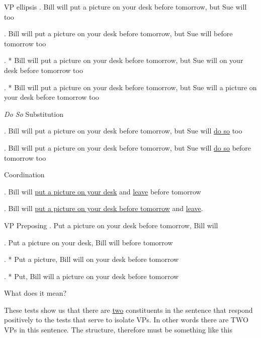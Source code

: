 \begin{frame}
  {VP ellipsis}
\ex.
Bill will put a picture on your desk before tomorrow, but Sue will  too

\ex.
Bill will put a picture on your desk before tomorrow, but Sue will  before tomorrow too
 
\ex.
* Bill will put a picture on your desk before tomorrow, but Sue will  on your desk before tomorrow too

\ex.
* Bill will put a picture on your desk before tomorrow, but Sue will  a picture on your desk before tomorrow too

\end{frame}

\begin{frame}
  {\textit{Do So} Substitution}


\ex.
Bill will put a picture on your desk before tomorrow, but Sue will \underline{do so} too


\ex.
Bill will put a picture on your desk before tomorrow, but Sue will \underline{do so} before tomorrow too

\end{frame}

\begin{frame}
{Coordination}

\ex.
Bill will \underline{put a picture on your desk} and \underline{leave}  before tomorrow


\ex.
Bill will \underline {put a picture on your desk before tomorrow} and \underline{leave}.

\end{frame}

\begin{frame}
  {VP Preposing}
\ex.
Put a picture on your desk before tomorrow, Bill will \newline {}

\ex.
Put a picture on your desk, Bill will \newline {} before tomorrow

\ex.
* Put a picture, Bill will  on your desk before tomorrow

\ex.
* Put, Bill will  a picture on your desk before tomorrow


\end{frame}

\begin{frame}
  {What does it mean?}

These tests show us that there are \underline{two} constituents in the sentence that respond positively to the tests that serve to isolate VPs.  In other words there are TWO VPs in this sentence.  The structure, therefore must be something like this

\end{frame}


